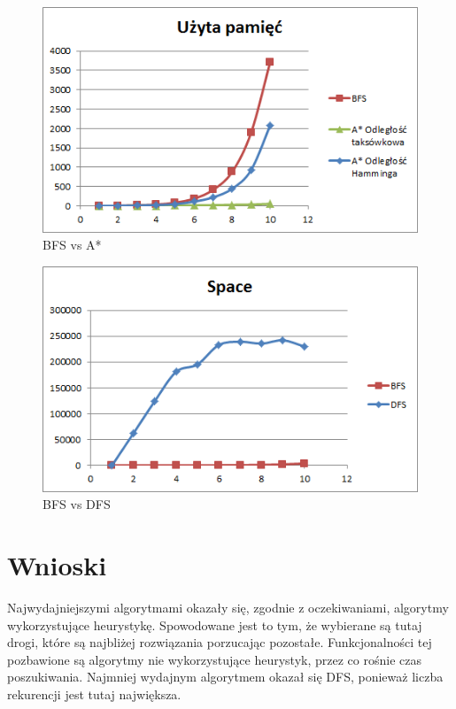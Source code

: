 \documentclass{classrep}
\begin{document}
\begin{figure}[ht]
\centering
			\includegraphics[scale=0.65]{pictures/space_BFS_vs_A.png}
	\caption{BFS vs A*}
	\label{fig:BFS vs A*}
\end{figure}

\begin{figure}[ht]
\centering
			\includegraphics[scale=0.65]{pictures/space_BFS_vs_DFS.png}
	\caption{BFS vs DFS}
	\label{fig:BFS vs DFS}
\end{figure}

\cleardoublepage

\section{Wnioski}
  Najwydajniejszymi algorytmami okazały się, zgodnie z oczekiwaniami, algorytmy wykorzystujące heurystykę. Spowodowane jest to tym, że wybierane są tutaj drogi, które są najbliżej rozwiązania porzucając pozostałe. Funkcjonalności tej pozbawione są algorytmy nie wykorzystujące heurystyk, przez co rośnie czas poszukiwania. Najmniej wydajnym algorytmem okazał się DFS, ponieważ liczba rekurencji jest tutaj największa.
\end{document}
